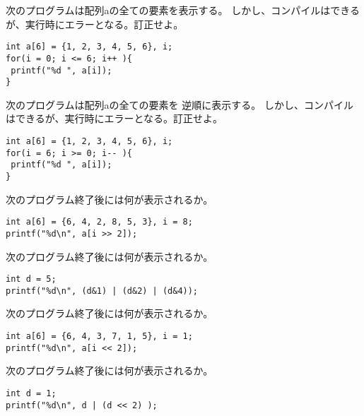 \documentclass[12pt,a4j]{jarticle}
\newcounter{toi}
\def\toi{%
\bigskip\bigskip\noindent
\addtocounter{toi}{1}
\shadowbox{\bfseries\large 問\thetoi}
\nopagebreak[4]\bigskip\nopagebreak[4]
}
\begin{document}
\toi



次のプログラムは配列aの全ての要素を表示する。
しかし、コンパイルはできるが、実行時にエラーとなる。訂正せよ。
\begin{verbatim}
int a[6] = {1, 2, 3, 4, 5, 6}, i;
for(i = 0; i <= 6; i++ ){
 printf("%d ", a[i]);
}
\end{verbatim}



\toi



次のプログラムは配列aの全ての要素を
逆順に表示する。
しかし、コンパイルはできるが、実行時にエラーとなる。訂正せよ。
\begin{verbatim}
int a[6] = {1, 2, 3, 4, 5, 6}, i;
for(i = 6; i >= 0; i-- ){
 printf("%d ", a[i]);
}
\end{verbatim}




\toi


次のプログラム終了後には何が表示されるか。
\begin{verbatim}
int a[6] = {6, 4, 2, 8, 5, 3}, i = 8;
printf("%d\n", a[i >> 2]);
\end{verbatim}


\toi


次のプログラム終了後には何が表示されるか。
\begin{verbatim}
int d = 5;
printf("%d\n", (d&1) | (d&2) | (d&4));
\end{verbatim}



\toi


次のプログラム終了後には何が表示されるか。
\begin{verbatim}
int a[6] = {6, 4, 3, 7, 1, 5}, i = 1;
printf("%d\n", a[i << 2]);
\end{verbatim}





\toi


次のプログラム終了後には何が表示されるか。
\begin{verbatim}
int d = 1;
printf("%d\n", d | (d << 2) );
\end{verbatim}
\end{document}

